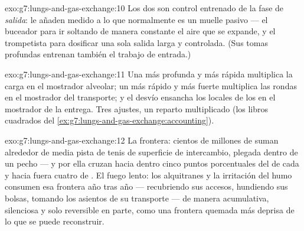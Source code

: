 \begin{solution}{exo:g7:lungs-and-gas-exchange:10}
Los dos son control entrenado de la fase de \emph{salida}: le añaden
 medido a lo que normalmente es un muelle pasivo --- el buceador
para ir soltando de manera constante el aire que se expande, y el
trompetista para dosificar una sola salida larga y controlada. (Sus
tomas profundas entrenan también el trabajo de entrada.)
\end{solution}

\begin{solution}{exo:g7:lungs-and-gas-exchange:11}
Una  más profunda y más rápida multiplica la carga en el
mostrador alveolar; un  más rápido y más fuerte multiplica las
rondas en el mostrador del transporte; y el desvío ensancha los 
locales de los  en el mostrador de la entrega. Tres ajustes, un
reparto multiplicado (los libros cuadrados del
\cref{ex:g7:lungs-and-gas-exchange:accounting}).
\end{solution}

\begin{solution}{exo:g7:lungs-and-gas-exchange:12}
La frontera: cientos de millones de  suman alrededor de media
pista de tenis de superficie de intercambio, plegada dentro de un pecho
--- y por ella cruzan hacia dentro cinco puntos porcentuales del
 de cada  y hacia fuera cuatro de .
El fuego lento: los alquitranes y la irritación del humo consumen esa
frontera año tras año --- recubriendo sus accesos, hundiendo sus
bolsas, tomando los asientos de su transporte --- de manera
acumulativa, silenciosa y solo reversible en parte, como una frontera
quemada más deprisa de lo que se puede reconstruir.
\end{solution}

